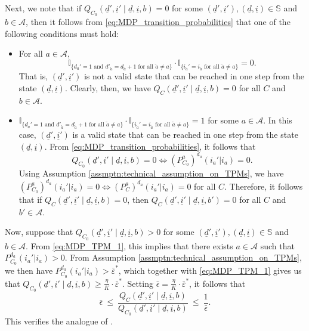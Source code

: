  Next, we note that if $Q_{C_0}(\underline{d}', \underline{i}' \mid \underline{d}, \underline{i}, b)=0$ for some $(\underline{d}', \underline{i}'), (\underline{d}, \underline{i}) \in \mathbb{S}$ and $b\in \mathcal{A}$, then it follows from \eqref{eq:MDP_transition_probabilities} that one of the following conditions must hold:
\begin{itemize}
	\item For all $a\in \mathcal{A}$, $$\mathbb{I}_{\{d_a'=1\text{ and }d'_{\tilde{a}}=d_{\tilde{a}}+1\text{ for all }\tilde{a}\neq a\}} \cdot \mathbb{I}_{\{i_{\tilde{a}}'=i_{\tilde{a}}\text{ for all }\tilde{a}\neq a\}}=0.$$ That is, $(\underline{d}', \underline{i}')$ is not a valid state that can be reached in one step from the state $(\underline{d}, \underline{i})$. Clearly, then, we have $Q_{C}(\underline{d}', \underline{i}' \mid \underline{d}, \underline{i}, b)=0$ for all $C$ and $b\in \mathcal{A}$.
	
	\item $\mathbb{I}_{\{d_a'=1\text{ and }d'_{\tilde{a}}=d_{\tilde{a}}+1\text{ for all }\tilde{a}\neq a\}} \cdot \mathbb{I}_{\{i_{\tilde{a}}'=i_{\tilde{a}}\text{ for all }\tilde{a}\neq a\}}=1$ for some $a\in \mathcal{A}$. In this case, $(\underline{d}', \underline{i}')$ is a valid state that can be reached in one step from the state $(\underline{d}, \underline{i})$. From \eqref{eq:MDP_transition_probabilities}, it follows that $$ Q_{C_0}(\underline{d}', \underline{i}' \mid \underline{d}, \underline{i}, b)=0 \Longleftrightarrow (P_{C_0}^a)^{d_a}(i_a'|i_a)=0. $$ Using Assumption \ref{assmptn:technical_assumption_on_TPMs}, we have $(P_{C_0}^a)^{d_a}(i_a'|i_a)=0 \Longleftrightarrow (P_{C}^a)^{d_a}(i_a'|i_a)=0$ for all $C$. Therefore, it follows that if $Q_{C}(\underline{d}', \underline{i}' \mid \underline{d}, \underline{i}, b)=0$, then $Q_{C}(\underline{d}', \underline{i}' \mid \underline{d}, \underline{i}, b')=0$ for all $C$ and $b'\in \mathcal{A}$.
\end{itemize}
Now, suppose that $Q_{C_0}(\underline{d}', \underline{i}' \mid \underline{d}, \underline{i}, b)>0$ for some $(\underline{d}', \underline{i}'), (\underline{d}, \underline{i})\in \mathbb{S}$ and $b\in \mathcal{A}$. From \eqref{eq:MDP_TPM_1}, this implies that there exists $a\in \mathcal{A}$ such that $P_{C_0}^{d_a}(i_a'|i_a)>0$. From Assumption \ref{assmptn:technical_assumption_on_TPMs}, we then have $P_{C_0}^{d_a}(i_a'|i_a)>\bar{\varepsilon}^*$, which together with \eqref{eq:MDP_TPM_1} gives us that $Q_{C_0}(\underline{d}', \underline{i}' \mid \underline{d}, \underline{i}, b)\geq \frac{\eta}{K}\cdot \bar{\varepsilon}^*$. Setting $\bar{\epsilon}=\frac{\eta}{K}\cdot \bar{\varepsilon}^*$, it follows that $$ \bar{\epsilon}~\leq~ \frac{Q_C(\underline{d}', \underline{i}' \mid \underline{d}, \underline{i}, b)}{Q_{C_0}(\underline{d}', \underline{i}' \mid \underline{d}, \underline{i}, b)} ~\leq~ \frac{1}{\bar{\epsilon}}.$$ This verifies the analogue of \cite[Assumption A3]{borkar1982identification}.

